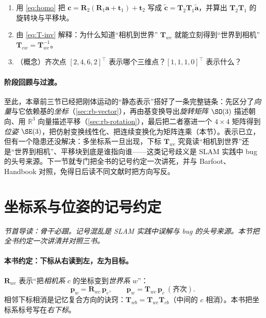 \begin{practice}
\begin{enumerate}
  \item 用 \cref{eq:homo} 把 $\mathbf{c}=\mathbf{R}_2(\mathbf{R}_1\mathbf{a}+\mathbf{t}_1)+\mathbf{t}_2$ 写成 $\tilde{\mathbf{c}}=\mathbf{T}_2\mathbf{T}_1\tilde{\mathbf{a}}$，并算出 $\mathbf{T}_2\mathbf{T}_1$ 的旋转块与平移块。
  \item 由 \cref{eq:T-inv} 解释：为什么知道“相机到世界” $\mathbf{T}_{wc}$ 就能立刻得到“世界到相机” $\mathbf{T}_{cw}=\mathbf{T}_{wc}^{-1}$。
  \item （概念）齐次点 $[2,4,6,2]^\top$ 表示哪个三维点？$[1,1,1,0]^\top$ 表示什么？
\end{enumerate}
\end{practice}

\paragraph{阶段回顾与过渡。}至此，本章前三节已经把刚体运动的“静态表示”搭好了一条完整链条：先区分了\emph{向量}与它依赖基的\emph{坐标}（\cref{sec:rb-vector}），再由基变换导出\emph{旋转矩阵} $\SO(3)$ 描述朝向、用 $\mathbb{R}^3$ 向量描述平移（\cref{sec:rb-rotation}），最后把二者塞进一个 $4\times4$ 矩阵得到\emph{位姿} $\SE(3)$，把仿射变换线性化、把连续变换化为矩阵连乘（本节）。表示已立，但有一个隐患还没解决：多坐标系一旦出现，下标 $\mathbf{T}_{wc}$ 究竟读“相机到世界”还是“世界到相机”、平移块到底是谁指向谁——这类记号歧义是 SLAM 实践中 bug 的头号来源。下一节就专门把全书的记号约定一次讲死，并与 Barfoot、Handbook 对照，免得日后读不同文献时把方向写反。

\section{坐标系与位姿的记号约定}
\label{sec:rb-convention}
\noindent\emph{节首导读：骨干必跟。记号混乱是 SLAM 实践中误解与 bug 的头号来源\cite{barfoot2024state}。本节把全书约定一次讲清并对照三书。}

\paragraph{本书约定：下标从右读到左，左为目标。}
$\mathbf{R}_{wc}$ 表示“把\emph{相机系} $c$ 的坐标变到\emph{世界系} $w$”：
\begin{equation}
  \mathbf{p}_w=\mathbf{R}_{wc}\,\mathbf{p}_c,\qquad \mathbf{p}_w=\mathbf{T}_{wc}\,\mathbf{p}_c\ (\text{齐次}).
\end{equation}
相邻下标相消是记忆复合方向的诀窍：$\mathbf{T}_{wb}=\mathbf{T}_{wc}\mathbf{T}_{cb}$（中间的 $c$ 相消）。本书把坐标系标号写在\emph{右下标}。


